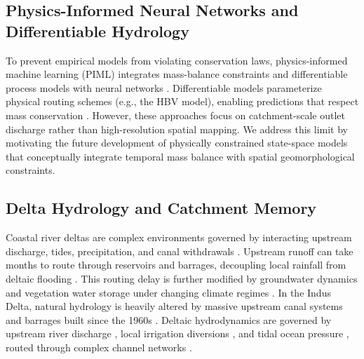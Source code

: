 \subsection{Physics-Informed Neural Networks and Differentiable Hydrology}
To prevent empirical models from violating conservation laws, physics-informed machine learning (PIML) integrates mass-balance constraints and differentiable process models with neural networks \citep{Karniadakis2021Physicsinformed, Shen2023Differentiable}. Differentiable models parameterize physical routing schemes (e.g., the HBV model), enabling predictions that respect mass conservation \citep{Feng2023The, Zhao2022Evaporative, Li2020Toward}. However, these approaches focus on catchment-scale outlet discharge rather than high-resolution spatial mapping. We address this limit by motivating the future development of physically constrained state-space models that conceptually integrate temporal mass balance with spatial geomorphological constraints.

\subsection{Delta Hydrology and Catchment Memory}
Coastal river deltas are complex environments governed by interacting upstream discharge, tides, precipitation, and canal withdrawals \citep{Wu2020Ensemble}. Upstream runoff can take months to route through reservoirs and barrages, decoupling local rainfall from deltaic flooding \citep{Scanlon2023Global, Lall2020A}. This routing delay is further modified by groundwater dynamics and vegetation water storage \citep{Jiao2021Observed, Dorigo2021The, Poggio2021SoilGrids} under changing climate regimes \citep{Tabari2020Climate, Berdugo2020Global, Jasechko2024Rapid, Gleeson2020Global, Lian2020Summer, MuñozSabater2021ERA5Land, Funk2015The}. In the Indus Delta, natural hydrology is heavily altered by massive upstream canal systems and barrages built since the 1960s \citep{Giosan2006Recent, Syvitski2009Sinking, Dunn2019Projections, Solangi2019Analysis, Salik2022Social}. Deltaic hydrodynamics are governed by upstream river discharge \citep{Karim2002Water}, local irrigation diversions \citep{Cheema2012Surface}, and tidal ocean pressure \citep{Salik2016Environmental, Mitra2024Assessing}, routed through complex channel networks \citep{Tejedor2015Delta1, Tejedor2015Delta2}.

